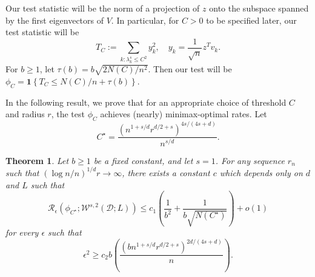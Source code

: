 \documentclass{article}
\newcommand{\set}[1]{\left\{#1\right\}}
\newcommand{\1}{\mathbf{1}}
\theoremstyle{alden}
\theoremstyle{aldenthm}
\newtheorem{theorem}{Theorem}
\theoremstyle{definition}
\theoremstyle{remark}
\begin{document}
Our test statistic will be the norm of a projection of $z$ onto the subspace spanned by the first eigenvectors of $V$. In particular, for $C > 0$ to be specified later, our test statistic will be
\begin{equation*}
T_C := \sum_{k: \lambda_k^s \leq C^2} y_k^2, \quad y_k = \frac{1}{\sqrt{n}} z^T v_k.
\end{equation*}
For $b \geq 1$, let $\tau(b) = b\sqrt{2N(C)/n^2}$. Then our test will be $\phi_{C} = \mathbf{1}\set{T_C \leq N(C)/n + \tau(b)}$. 

In the following result, we prove that for an appropriate choice of threshold $C$ and radius $r$, the test $\phi_C$ achieves (nearly) minimax-optimal rates. Let
\begin{equation*}
C^{\star} = \frac{\left(n^{1 + s/d}r^{d/2 + s}\right)^{4s/(4s + d)}}{n^{s/d}}.
\end{equation*}

\begin{theorem}
	\label{thm:sobolev_testing_rate}
	Let $b \geq 1$ be a fixed constant, and let $s = 1$. For any sequence $r_n$ such that $(\log n/n)^{1/d}r \to \infty$, there exists a constant $c$ which depends only on $d$ and $L$ such that
	\begin{equation}
	\label{eqn:sobolev_testing_rate_1}
	\mathcal{R}_{\epsilon}(\phi_{C^{\star}}; \mathcal{W}^{s,2}(\mathcal{D};L)) \leq c_1\left(\frac{1}{b^2} + \frac{1}{b\sqrt{N(C^{\star})}}\right) + o(1)
	\end{equation}
	for every $\epsilon$ such that
	\begin{equation}
	\label{eqn:sobolev_testing_rate}
	\epsilon^2 \geq c_2 b \left(\frac{(b n^{1 + s/d}r^{d/2 + s})^{2d/(4s + d)}}{n}\right).
	\end{equation}
\end{theorem}
\end{document}
